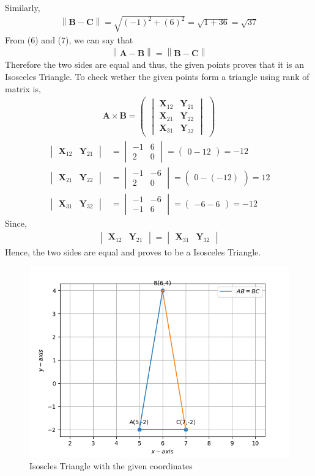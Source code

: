 \documentclass[12pt]{article}
\newcommand{\mydet}[1]{\ensuremath{\begin{vmatrix}#1\end{vmatrix}}}
\providecommand{\norm}[1]{\left\lVert#1\right\rVert}
\newcommand{\myvec}[1]{\ensuremath{\begin{pmatrix}#1\end{pmatrix}}}
\let\vec\mathbf
\begin{document}
\begin{enumerate}
\begin{align}
	\end{align}  
	Similarly,
	\begin{align}
		\norm{\vec{B}-\vec{C}} = \sqrt{(-1)^2+(6)^2} = \sqrt{1+36} = \sqrt{37}
\end{align}	  	
From (6) and (7), we can say that
	\begin{align}
		\norm{\vec{A}-\vec{B}} = \norm{\vec{B}-\vec{C}}
	\end{align}
Therefore the two sides are equal and thus, the given points proves that it is an Isosceles Triangle.
To check wether the given points form a triangle using rank of matrix is,
\begin{align}
 \vec{A} \times \vec{B} = \myvec{\mydet{\vec{X}_{12}&\vec{Y}_{21}\\\vec{X}_{21}&\vec{Y}_{22}\\\vec{X}_{31}&\vec{Y}_{32}}}
\end{align}
\begin{align}
 \mydet{\vec{X}_{12}&\vec{Y}_{21}}&=\mydet{-1&6\\2&0}=\myvec{0-12}=-12\\
 \mydet{\vec{X}_{21}&\vec{Y}_{22}}&=\mydet{-1&-6\\2&0}=\myvec{0-(-12)}=12\\
 \mydet{\vec{X}_{31}&\vec{Y}_{32}}&=\mydet{-1&-6\\-1&6}=\myvec{-6-6}=-12
\end{align}
Since, 
\begin{align}
\mydet{\vec{X}_{12}&\vec{Y}_{21}} = \mydet{\vec{X}_{31}&\vec{Y}_{32}}
\end{align}
Hence, the two sides are equal and proves to be a Isosceles Triangle.
\begin{figure}[!h]
	\begin{center} 
	    \includegraphics[width=\columnwidth]{figs/Vector2.png}
	\end{center}
\caption{Isoscles Triangle with the given coordinates}
\label{fig:Fig}
\end{figure}
\end{enumerate}
\end{document}
